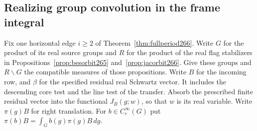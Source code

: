 \documentclass[a4paper,11pt]{article}
\theoremstyle{definition}
\theoremstyle{remark}
\numberwithin{equation}{section}
\begin{document}
\subsection{Realizing group convolution in the frame integral}\label{nav:VII-44}
Fix one horizontal edge \(i\ge2\) of
Theorem~\ref{thm:fullperiod266}. Write \(G\) for the product
of its real source groups and \(R\) for the product of the
real flag stabilizers in Propositions~\ref{prop:besorbit265}
and~\ref{prop:jacorbit266}. Give these groups and \(R\backslash G\)
the compatible measures of those propositions. Write \(B\) for
the incoming row, and \(\beta\) for the specified residual
real Schwartz vector. It includes the descending core test
and the line test of the transfer. Absorb the prescribed
finite residual vector into the functional \(J_B(g;w)\), so
that \(w\) is its real variable. Write \(\pi(g)B\) for right
translation. For \(b\in C_c^\infty(G)\) put
\(\pi(b)B=\int_G b(g)\pi(g)B\,dg\).
\end{document}
